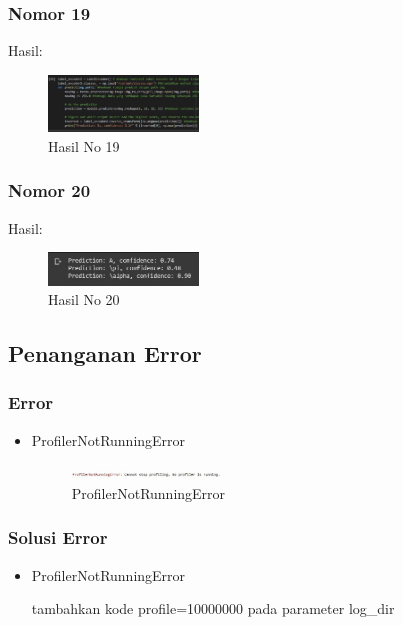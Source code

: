 \subsubsection{Nomor 19}
\hfill\break

Hasil:
\begin{figure}[H]
\centering
	\includegraphics[width=4cm]{figures/1174053/7/no19.jpg}
	\caption{Hasil No 19}
\end{figure}

\subsubsection{Nomor 20}
\hfill\break

Hasil:
\begin{figure}[H]
\centering
	\includegraphics[width=4cm]{figures/1174053/7/no20.jpg}
	\caption{Hasil No 20}
\end{figure}
\subsection{Penanganan Error}
\subsubsection{Error}
\hfill\break
\begin{itemize}
\item ProfilerNotRunningError

\begin{figure}[H]
\centering
	\includegraphics[width=4cm]{figures/1174053/7/error1.jpg}
\caption{ProfilerNotRunningError}
\end{figure}
\end{itemize}
\subsubsection{Solusi Error}
\hfill\break
\begin{itemize}
\item ProfilerNotRunningError

tambahkan kode profile=10000000 pada parameter log\_dir
\end{itemize}

